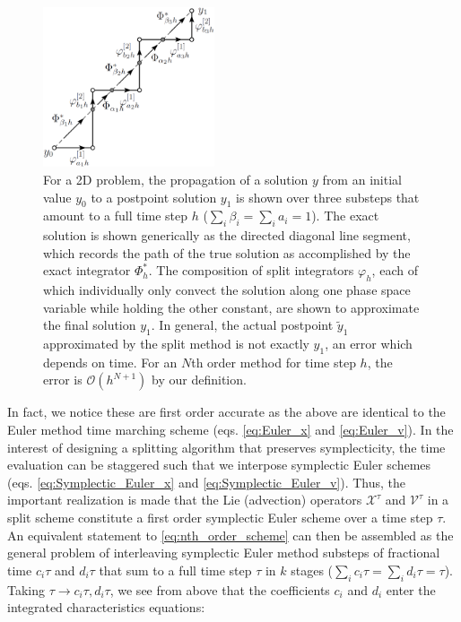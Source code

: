 \documentclass[11pt,titlepage]{report}
\begin{document}
 \begin{figure}[h!]
  \centering
    \includegraphics[width=0.45\textwidth]{graphics/split_methods_nstep}
  \caption{For a 2D problem, the propagation of a solution $y$ from an initial value $y_0$ to a postpoint solution $y_1$ is shown over three substeps that amount to a full time step $h$ ($\sum_i \beta_i = \sum_i a_i = 1$). The exact solution is shown generically as the directed diagonal line segment, which records the path of the true solution as accomplished by the exact integrator $\Phi^*_h$. The composition of split integrators $\varphi_{h}$, each of which individually only convect the solution along one phase space variable while holding the other constant, are shown to approximate the final solution $y_1$. In general, the actual postpoint $\tilde{y}_1$ approximated by the split method is not exactly $y_1$, an error which depends on time. For an $N$th order method for time step $h$, the error is $\mathcal{O}(h^{N+1})$ by our definition.}
  \label{fig:n_step_split_diagram}
\end{figure}


 In fact, we notice these are first order accurate as the above are identical to the Euler method time marching scheme (eqs. \eqref{eq:Euler_x} and \eqref{eq:Euler_v}). In the interest of designing a splitting algorithm that preserves symplecticity, the time evaluation can be staggered such that we interpose symplectic Euler schemes (eqs. \eqref{eq:Symplectic_Euler_x} and \eqref{eq:Symplectic_Euler_v}). Thus, the important realization is made that the Lie (advection) operators $\mathcal{X}^{\tau}$ and $\mathcal{V}^{\tau}$ in a split scheme constitute a first order symplectic Euler scheme over a time step $\tau$. An equivalent statement to \eqref{eq:nth_order_scheme} can then be assembled as the general problem of interleaving symplectic Euler method substeps of fractional time $c_i\tau$ and $d_i\tau$ that sum to a full time step $\tau $ in $k$ stages ($\sum_i c_i \tau = \sum_i d_i \tau = \tau$). Taking $\tau \rightarrow c_i\tau , d_i\tau$, we see from above that the coefficients $c_i$ and $d_i$ enter the integrated characteristics equations:
\end{document}
